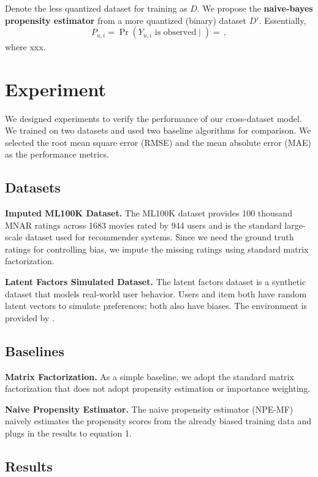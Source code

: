 \documentclass{article}
\begin{document}
Denote the less quantized dataset for training as $D$. We propose the \textbf{naive-bayes propensity estimator} from a more quantized (binary) dataset $D'$. Essentially,
\begin{equation} 
  P_{u,i} = \Pr(Y_{u,i} \text{ is observed} \mid ) = \frac{}{\text{}},
\end{equation}
where xxx. 

\section{Experiment}
We designed experiments to verify the performance of our cross-dataset model. We trained on two datasets and used two baseline algorithms for comparison. We selected the root mean square error (RMSE) and the mean absolute error (MAE) as the performance metrics.

\subsection{Datasets}
\textbf{Imputed ML100K Dataset.}
The ML100K dataset provides 100 thousand MNAR ratings across 1683 movies rated by 944 users and is the standard large-scale dataset used for recommender systems. Since we need the ground truth ratings for controlling bias, we impute the missing ratings using standard matrix factorization. 

\textbf{Latent Factors Simulated Dataset.}
The latent factors dataset is a synthetic dataset that models real-world user behavior. Users and item both have random latent vectors to simulate preferences; both also have biases. The environment is provided by \cite{krauth2020offline}.

\subsection{Baselines}
\textbf{Matrix Factorization.}
As a simple baseline, we adopt the standard matrix factorization that does not adopt propensity estimation or importance weighting.

\textbf{Naive Propensity Estimator.}
The naive propensity estimator (NPE-MF) naively estimates the propensity scores from the already biased training data and plugs in the results to equation 1.
 
\subsection{Results}
\end{document}
